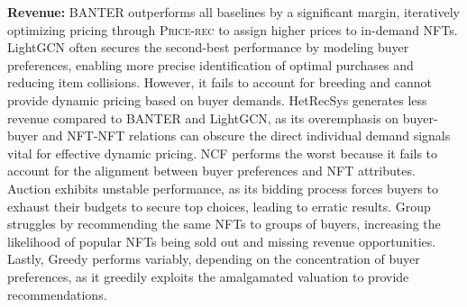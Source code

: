 \documentclass[conference]{IEEEtran}
\theoremstyle{plain}
\begin{document}
\noindent\textbf{Revenue:} BANTER\xspace outperforms all baselines by a significant margin, iteratively optimizing pricing through \textsc{Price-rec}\xspace to assign higher prices to in-demand NFTs. \textsf{LightGCN} often secures the second-best performance by modeling buyer preferences, enabling more precise identification of optimal purchases and reducing item collisions. However, it fails to account for breeding and cannot provide dynamic pricing based on buyer demands. \textsf{HetRecSys} generates less revenue compared to BANTER\xspace and \textsf{LightGCN}, as its overemphasis on buyer-buyer and NFT-NFT relations can obscure the direct individual demand signals vital for effective dynamic pricing. \textsf{NCF} performs the worst because it fails to account for the alignment between buyer preferences and NFT attributes. \textsf{Auction} exhibits unstable performance, as its bidding process forces buyers to exhaust their budgets to secure top choices, leading to erratic results. \textsf{Group} struggles by recommending the same NFTs to groups of buyers, increasing the likelihood of popular NFTs being sold out and missing revenue opportunities. Lastly, \textsf{Greedy} performs variably, depending on the concentration of buyer preferences, as it greedily exploits the amalgamated valuation to provide recommendations.
\end{document}
